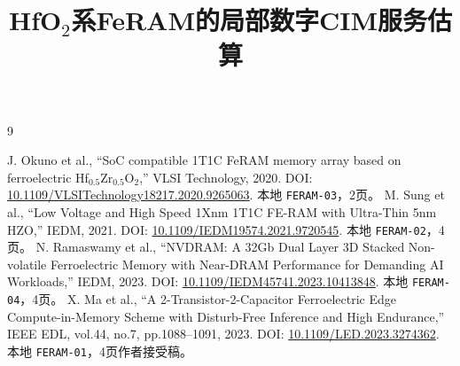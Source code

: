 \documentclass[11pt,a4paper,fontset=fandol]{ctexart}
\title{\bfseries HfO$_2$系FeRAM的局部数字CIM服务估算}
\author{}\date{}
\newcommand{\sid}[1]{\texttt{#1}}
\begin{document}
\maketitle\vspace{-2em}


\begin{thebibliography}{9}\small\raggedright
{} J. Okuno et al., ``SoC compatible 1T1C FeRAM memory array based on ferroelectric Hf$_{0.5}$Zr$_{0.5}$O$_2$,'' VLSI Technology, 2020. DOI: \href{https://doi.org/10.1109/VLSITechnology18217.2020.9265063}{10.1109/VLSITechnology18217.2020.9265063}. 本地 \sid{FERAM-03}，2页。
 M. Sung et al., ``Low Voltage and High Speed 1Xnm 1T1C FE-RAM with Ultra-Thin 5nm HZO,'' IEDM, 2021. DOI: \href{https://doi.org/10.1109/IEDM19574.2021.9720545}{10.1109/IEDM19574.2021.9720545}. 本地 \sid{FERAM-02}，4页。
 N. Ramaswamy et al., ``NVDRAM: A 32Gb Dual Layer 3D Stacked Non-volatile Ferroelectric Memory with Near-DRAM Performance for Demanding AI Workloads,'' IEDM, 2023. DOI: \href{https://doi.org/10.1109/IEDM45741.2023.10413848}{10.1109/IEDM45741.2023.10413848}. 本地 \sid{FERAM-04}，4页。
 X. Ma et al., ``A 2-Transistor-2-Capacitor Ferroelectric Edge Compute-in-Memory Scheme with Disturb-Free Inference and High Endurance,'' IEEE EDL, vol.44, no.7, pp.1088--1091, 2023. DOI: \href{https://doi.org/10.1109/LED.2023.3274362}{10.1109/LED.2023.3274362}. 本地 \sid{FERAM-01}，4页作者接受稿。
\end{thebibliography}
\end{document}
